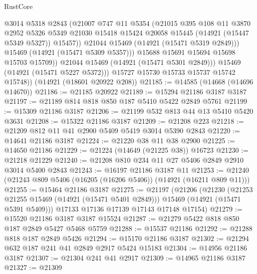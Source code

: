 \begin{lexlean}{RustCore}
\begin{coremodule}
                    @3014
                    @5318
                    @2843
                    (@21007
                      @747
                      @11
                      @5354
                      (@21015
                        @395
                        @108
                        @11
                        @3870
                        @2952
                        @5326
                        @5349
                        @21030
                        @15418
                        @15424
                        @20058
                        @15445
                        (@14921 (@15447 @5349 @5327))
                        @15457))
                    @21044
                    @15469
                    (@14921 (@15471 @5319 @2849)))
                  @15469
                  (@14921 (@15471 @5309 @5357)))
                @15688
                @15691
                @15694
                @15698
                @15703
                @15709))
            @21044
            @15469
            (@14921 (@15471 @5301 @2849)))
          @15469
          (@14921 (@15471 @5227 @5372)))
        @15727
        @15730
        @15733
        @15737
        @15742
        @15748))
    (@14921 (@18601 @20922 @208))
@21185 := @14585 (@14668 (@14696 @14670))
@21186 := @21185 @20922
@21189 := @15294 @21186 @3187 @3187
@21197 := @21189 @814 @818 @850 @187 @5410 @5422 @2849 @5761
@21199 := @15309 @21186 @3187
@21206 := @21199 @532 @813 @44 @13 @5410 @5420 @3631
@21208 := @15322 @21186 @3187
@21209 := @21208 @223
@21218 := @21209 @812 @11 @41 @2900 @5409 @5419 @3014 @5390 @2843
@21220 := @14641 @21186 @3187
@21224 := @21220 @38 @11 @38 @2900
@21225 := @14650 @21186
@21229 := @21224 (@14649 (@21225 @38)) @16723
@21230 := @21218 @21229
@21240 := @21208 @810 @234 @11 @27 @5406 @2849 @2910 @3014 @5400 @2843
@21243 := @16197 @21186 @3187 @11
@21253 := @21240 (@21243 @809 @5406 (@16205 (@16206 @5406)) (@14921 (@16211 @809 @11)))
@21255 := @15464 @21186 @3187
@21275 := @21197
    (@21206
      (@21230
        (@21253 @21255 @15469 (@14921 (@15471 @5401 @2849)))
        @15469
        (@14921 (@15471 @5391 @5409)))
      @17133
      @17136
      @17139
      @17143
      @17148
      @17154)
@21279 := @15520 @21186 @3187 @3187 @15524
@21287 := @21279 @5422 @818 @850 @187 @2849 @5427 @5468 @5759
@21288 := @15537 @21186
@21292 := @21288 @818 @187 @2849 @5426
@21294 := @15170 @21186 @3187
@21302 := @21294 @632 @187 @241 @41 @2849 @2917 @5424 @15183
@21304 := @14956 @21186 @3187
@21307 := @21304 @241 @41 @2917
@21309 := @14965 @21186 @3187
@21327 := @21309

\end{coremodule}
\end{lexlean}
